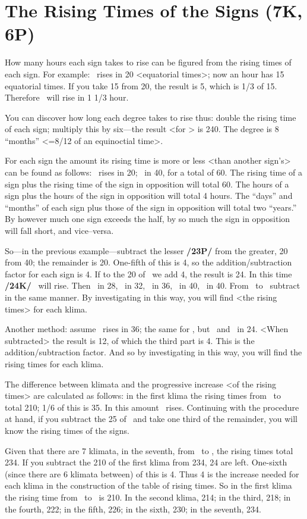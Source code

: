 \section{The Rising Times of the Signs (7K, 6P)}
How many hours each sign takes to rise can be figured from the rising times of each sign. For example: \Aries\, rises in 20 <equatorial times>; now an hour has 15 equatorial times. If you take 15 from 20, the result is 5, which is 1/3 of 15. Therefore \Aries\, will rise in 1 1/3 hour.

You can discover how long each degree takes to rise thus: double the rising time of each sign; multiply this by six—the result <for \Aries> is 240. The degree is 8 “months” <=8/12 of an equinoctial time>.

For each sign the amount its rising time is more or less <than another sign’s> can be found as follows: \Aries\, rises in 20; \Libra\, in 40, for a total of 60. The rising time of a sign plus the rising time of the sign in opposition will total 60. The hours of a sign plus the hours of the sign in opposition will total 4 hours. The “days” and “months” of each sign plus those of the sign in opposition will total two “years.” By however much one sign exceeds the half, by so much the sign in opposition will fall short, and vice–versa. 

So—in the previous example—subtract the lesser \textbf{/23P/} from the greater, 20 from 40; the remainder is 20. One-fifth of this is 4, so the addition/subtraction factor for each sign is 4. If to the 20 of \Aries\, we add 4, the result is 24. In this time \textbf{/24K/} \Taurus\, will rise. Then \Gemini\, in 28, \Cancer\, in 32, \Leo\, in 36, \Virgo\, in 40, \Libra\, in 40. From \Scorpio\, to \Pisces\, subtract in the same manner. By investigating in this way, you will find <the rising times> for each klima.

Another method: assume \Leo\, rises in 36; the same for \Scorpio, but \Taurus\, and \Aquarius\, in 24. <When subtracted> the result is 12, of which the third part is 4. This is the addition/subtraction factor. And so by investigating in this way, you will find the rising times for each klima.

The difference between klimata and the progressive increase <of the rising times> are calculated as follows: in the first klima the rising times from \Cancer\, to \Sagittarius\, total 210; 1/6 of this is 35. In this amount \Leo\, rises. Continuing with the procedure at hand, if you subtract the 25 of \Aquarius\, and take one third of the remainder, you will know the rising times of the signs.

Given that there are 7 klimata, in the seventh, from \Cancer\, to \Sagittarius, the rising times total 234. If
you subtract the 210 of the first klima from 234, 24 are left. One-sixth (since there are 6 klimata between) of this is 4. Thus 4 is the increase needed for each klima in the construction of the table of rising times. So in the first klima the rising time from \Cancer\, to \Sagittarius\, is 210. In the second klima, 214; in the
third, 218; in the fourth, 222; in the fifth, 226; in the sixth, 230; in the seventh, 234.

\newpage